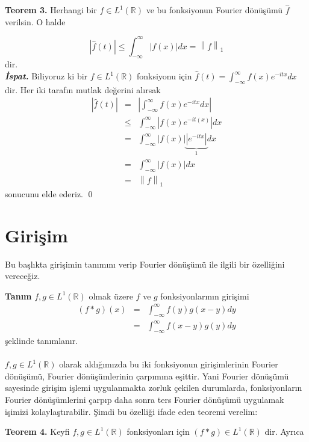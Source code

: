 \documentclass[a4paper, 9pt]{article}
\begin{document}
\textbf{Teorem 3.} Herhangi bir $f\in L^1(\mathbb{R})$ ve bu fonksiyonun Fourier dönüşümü $\widehat{f}$ verilsin. O halde

$$ \left| \widehat{f}(t) \right| \leq \int_{-\infty}^{\infty} \left| f(x) \right| dx = \left \| f \right \|_{1}  $$
dir. \\
\textit{\textbf{İspat.}} Biliyoruz ki bir $f \in L^1(\mathbb{R})$ fonksiyonu için $\widehat{f}(t) =  \int_{-\infty }^{\infty } f(x) e^{-itx}dx$ dir. Her iki tarafın mutlak değerini alırsak
	\begin{eqnarray*} 
		\left| \widehat{f}(t) \right| &=& \left| \int_{-\infty }^{\infty } f(x) e^{-itx}dx \right| \\
		&\leq &  \int_{-\infty }^{ \infty } \left| f(x)e^{-it(x)} \right| dx \\   
		&=& \int_{- \infty}^{\infty} \left| f(x) \right| \underbrace{\left| e^{-itx} \right| }_{1} dx \\
		&=& \int_{- \infty}^{\infty} \left| f(x) \right| dx \\
		&=& \left \| f \right \|_{1}
	\end{eqnarray*}
sonucunu elde ederiz. \qed

\section{Girişim}

Bu başlıkta girişimin tanımını verip Fourier dönüşümü ile ilgili bir özelliğini vereceğiz.

\textbf{Tanım} $f,g \in L^1(\mathbb{R})$ olmak üzere $f$ ve $g$ fonksiyonlarının girişimi
\begin{eqnarray*} 
 \left( f\ast g \right) (x) &=& \int_{- \infty}^{\infty} f(y) g(x-y) dy\\
 &=& \int_{- \infty}^{\infty} f(x-y) g(y) dy
\end{eqnarray*}
şeklinde tanımlanır.

\paragraph{}
$f,g \in L^1(\mathbb{R})$ olarak aldığımızda bu iki fonksiyonun girişimlerinin Fourier dönüşümü, Fourier dönüşümlerinin çarpımına eşittir. Yani Fourier dönüşümü sayesinde girişim işlemi uygulanmakta zorluk çekilen durumlarda, fonksiyonların Fourier dönüşümlerini çarpıp daha sonra ters Fourier dönüşümü uygulamak işimizi kolaylaştırabilir. Şimdi bu özelliği ifade eden teoremi verelim:

\textbf{Teorem 4.} Keyfi $f,g \in L^1(\mathbb{R})$ fonksiyonları için $\left( f\ast g \right) \in L^1(\mathbb{R})$ dir. Ayrıca
\end{document}
